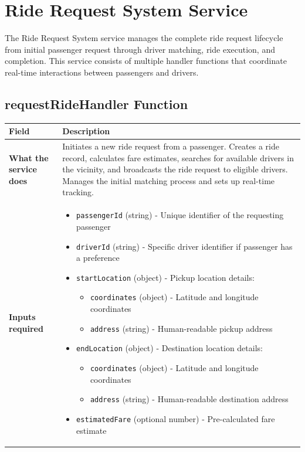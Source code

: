 \documentclass[11pt,a4paper]{article}
\begin{document}
\section{Ride Request System Service}

The Ride Request System service manages the complete ride request lifecycle from initial passenger request through driver matching, ride execution, and completion. This service consists of multiple handler functions that coordinate real-time interactions between passengers and drivers.

\subsection{requestRideHandler Function}

\begin{longtable}{|p{4cm}|p{12cm}|}
\hline
\textbf{Field} & \textbf{Description} \\
\hline
\textbf{What the service does} & 
Initiates a new ride request from a passenger. Creates a ride record, calculates fare estimates, searches for available drivers in the vicinity, and broadcasts the ride request to eligible drivers. Manages the initial matching process and sets up real-time tracking. \\
\hline
\textbf{Inputs required} & 
\begin{itemize}[nosep]
\item \texttt{passengerId} (string) - Unique identifier of the requesting passenger
\item \texttt{driverId} (string) - Specific driver identifier if passenger has a preference
\item \texttt{startLocation} (object) - Pickup location details:
  \begin{itemize}[nosep]
    \item \texttt{coordinates} (object) - Latitude and longitude coordinates
    \item \texttt{address} (string) - Human-readable pickup address
  \end{itemize}
\item \texttt{endLocation} (object) - Destination location details:
  \begin{itemize}[nosep]
    \item \texttt{coordinates} (object) - Latitude and longitude coordinates
    \item \texttt{address} (string) - Human-readable destination address
  \end{itemize}
\item \texttt{estimatedFare} (optional number) - Pre-calculated fare estimate

\end{itemize}
\end{longtable}
\end{document}
